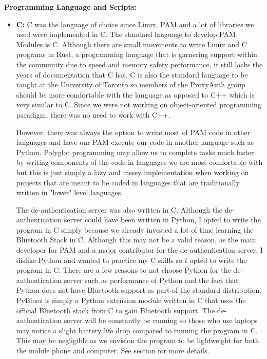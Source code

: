 \documentclass[letterpaper,twocolumn,10pt]{article}
\begin{document}
\hrulefill

\textbf{Programming Language and Scripts:}
\begin{itemize}[noitemsep]
\item \textbf{C:} C was the language of choice since Linux, PAM and a lot of libraries we used were implemented in C. The standard language to develop PAM Modules is C. Although there are small movements to write Linux and C programs in Rust, a programming language that is garnering support within the community due to speed and memory safety performance, it still lacks the years of documentation that C has. C is also the standard language to be taught at the University of Toronto so members of the ProxyAuth group should be more comfortable with the language as opposed to C++ which is very similar to C. Since we were not working on object-oriented programming paradigm, there was no need to work with C++.

However, there was always the option to write most of PAM code in other languages and have our PAM execute our code in another language such as Python. Polyglot programming may allow us to complete tasks much faster by writing components of the code in languages we are most comfortable with but this is just simply a lazy and messy implementation when working on projects that are meant to be coded in languages that are traditionally written in "lower" level languages.

The de-authentication server was also written in C. Although the de-authentication server could have been written in Python, I opted to write the program in C simply because we already invested a lot of time learning the Bluetooth Stack in C. Although this may not be a valid reason, as the main developer for PAM and a major contributor for the de-authentication server, I dislike Python and wanted to practice my C skills so I opted to write the program in C. There are a few reasons to not choose Python for the de-authentication server such as performance of Python and the fact that Python does not have Bluetooth support as part of the standard distribution. PyBluez is simply a Python extension module written in C that uses the official Bluetooth stack from C to gain Bluetooth support. The de-authentication server will be constantly be running so those who use laptops may notice a slight battery life drop compared to running the program in C. This may be negligible as we envision the program to be lightweight for both the mobile phone and computer. See section \textbf{} for more details.


\end{itemize}
\end{document}
